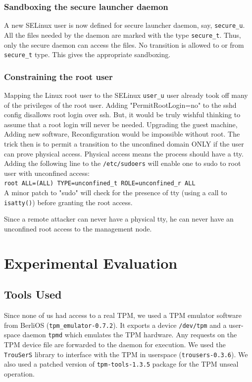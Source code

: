 \documentclass[10pt,twocolumn,pdftex]{article}
\begin{document}
\subsubsection{Sandboxing the secure launcher daemon}
A new SELinux user is now defined for secure launcher daemon, say, {\tt secure\_u}. All the files needed by the daemon are marked with the type {\tt secure\_t}. Thus, only the secure daemon can access the files. No transition is allowed to or from {\tt secure\_t} type. This gives the appropriate sandboxing. 

\subsubsection{Constraining the root user}
Mapping the Linux root user to the SELinux {\tt user\_u} user already took off many of the privileges of the root user. Adding "PermitRootLogin=no" to the sshd config disallows root login over ssh. But, it would be truly wishful thinking to assume that a root login will never be needed. Upgrading the guest machine, Adding new software, Reconfiguration would be impossible without root. The trick then is to permit a transition to the unconfined domain ONLY if the user can prove physical access. Physical access means the process should have a tty. Adding the following line to the {\tt /etc/sudoers} will enable one to sudo to root user with unconfined access: \\

{\tt root ALL=(ALL) TYPE=unconfined\_t ROLE=unconfined\_r ALL} \\

A minor patch to "sudo" will check for the presence of tty (using a call to {\tt isatty()}) before granting the root access. 

Since a remote attacker can never have a physical tty, he can never have an unconfined root access to the management node.

\section{Experimental Evaluation}
\label{sec:evaluation}

\subsection{Tools Used}
Since none of us had access to a real TPM, we used a TPM emulator software from BerliOS ({\tt tpm\_emulator-0.7.2}). It exports a device {\tt /dev/tpm} and a user-space daemon {\tt tpmd} which emulates the TPM hardware. Any requests on the TPM device file are forwarded to the daemon for execution. We used the {\tt TrouSerS} library to interface with the TPM in userspace ({\tt trousers-0.3.6}). We also used a patched version of {\tt tpm-tools-1.3.5} package for the TPM unseal operation.
\end{document}
